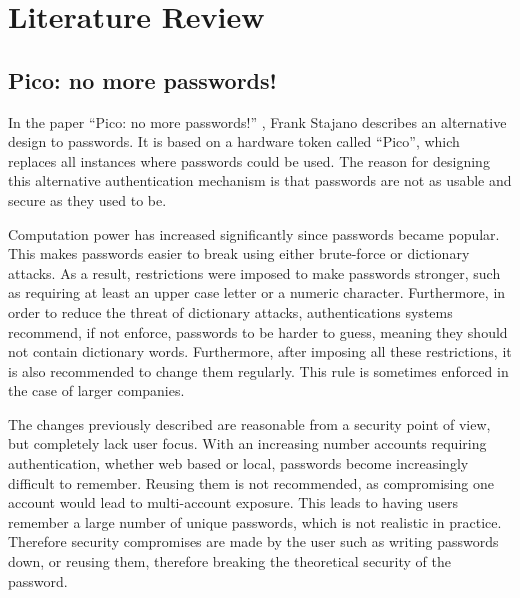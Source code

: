 
\chapter{Literature Review} %

\label{Chapter2}


\section{Pico: no more passwords!}

In the paper ``Pico: no more passwords!'' \cite{stajano2011pico}, Frank Stajano describes an alternative design to passwords. It is based on a hardware token called ``Pico'', which replaces all instances where passwords could be used. The reason for designing this alternative authentication mechanism is that passwords are not as usable and secure as they used to be. 

Computation power has increased significantly since passwords became popular. This makes passwords easier to break using either brute-force or dictionary attacks. As a result, restrictions were imposed to make passwords stronger, such as requiring at least an upper case letter or a numeric character. Furthermore, in order to reduce the threat of dictionary attacks, authentications systems recommend, if not enforce, passwords to be harder to guess, meaning they should not contain dictionary words. Furthermore, after imposing all these restrictions, it is also recommended to change them regularly. This rule is sometimes enforced in the case of larger companies.

The changes previously described are reasonable from a security point of view, but completely lack user focus. With an increasing number accounts requiring authentication, whether web based or local, passwords become increasingly difficult to remember. Reusing them is not recommended, as compromising one account would lead to multi-account exposure. This leads to having users remember a large number of unique passwords, which is not realistic in practice. Therefore security compromises are made by the user such as writing passwords down, or reusing them, therefore breaking the theoretical security of the password.


